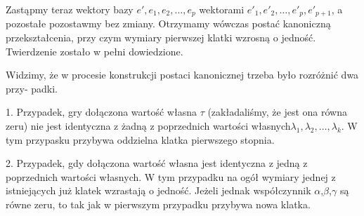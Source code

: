 \documentclass{article}
\begin{document}
Zastąpmy teraz wektory bazy \begin{math}e',e_1,e_2, \ldots,e_p\end{math} wektorami \begin{math}e'_1,e'_2, \ldots,e'_p, e'_{p+1}\end{math}, a pozostałe
pozostawmy bez zmiany. Otrzymamy wówczas postać kanoniczną przekształcenia, przy
czym wymiary pierwszej klatki wzrosną o jedność. Twierdzenie zostało w pełni dowiedzione.
  \par Widzimy, że w procesie konstrukcji postaci kanonicznej trzeba było rozróżnić dwa przy-
padki.
  \par 1. Przypadek, gry dołączona wartość własna $\tau$ (zakładaliśmy, że jest ona równa zeru)
nie jest identyczna z żadną z poprzednich wartości własnych\begin{math} \lambda_1, \lambda_2, \ldots, \lambda_k\end{math}. W tym przypasku przybywa oddzielna klatka pierwszego stopnia.
  \par 2. Przypadek, gdy dołączona wartość własna jest identyczna z jedną z poprzednich 
wartości własnych. W tym przypadku na ogół wymiary jednej z istniejących już klatek
wzrastają o jedność. Jeżeli jednak współczynnik $\alpha$,$\beta$,$\gamma$ są równe zeru, to tak jak w pierwszym
przypadku przybywa nowa klatka.
\end{document}
